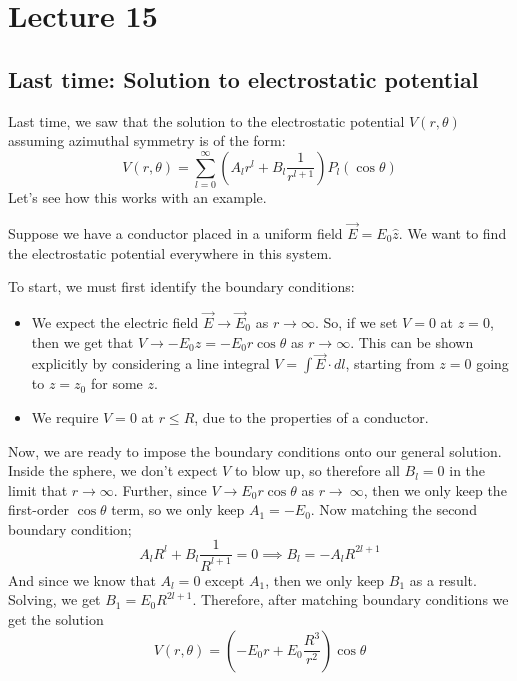 \chapter{Lecture 15}

\section{Last time: Solution to electrostatic potential}

Last time, we saw that the solution to the electrostatic potential $V(r, \theta)$ assuming azimuthal symmetry
is of the form: 
\[
	V(r, \theta) = \sum_{l = 0}^\infty \left(A_lr^l + B_l \frac{1}{r^{l + 1}}\right) P_l(\cos \theta)
\] 
Let's see how this works with an example.

\begin{example*}{}{}
	Suppose we have a conductor placed in a uniform field $\vec E = E_0 \hat{z}$. We want to find the
	electrostatic
	potential everywhere in this system. 

	To start, we must first identify the boundary conditions:
	
	\begin{itemize}
		\item We expect the electric field $\vec E \to \vec E_0$ as $r \to \infty$. So, if we set $V = 0$ at $z =0$, then we get that $V \to 
	- E_0 z =-  E_0 r \cos \theta$ as $r \to \infty$. This can be shown explicitly by considering a line integral $V = \int 
	\vec E \cdot dl$, starting from $z = 0$ going to $z = z_0$ for some $z$. 
	\item We require $V = 0$ at $r \le R$, due to the properties of a conductor.  
	\end{itemize}
	Now, we are ready to impose the boundary conditions onto our general solution. Inside the sphere, we don't 
	expect $V$ to blow up, so therefore all $B_l = 0$ in the limit that $r \to \infty$. Further, since $V \to E_0 r \cos \theta$ as $r \to \
	\infty$, then we only keep the first-order $\cos \theta$ term, so we only keep $A_1 = -E_0$. Now matching
	the second boundary condition;
	\[
		A_l R^l + B_l \frac{1}{R^{l + 1}} = 0 \implies B_l = -A_l R^{2l + 1}
	\] 
	And since we know that $A_l = 0$ except $A_1$, then we only keep $B_1$ as a result. Solving, we get $B_1 = 
	E_0 R^{2l +1}$. Therefore, after matching boundary conditions we get the solution 
	\[
	V(r, \theta) = \left( -E_0 r + E_0 \frac{R^3}{r^2} \right) \cos \theta
	\] 
\end{example*}


